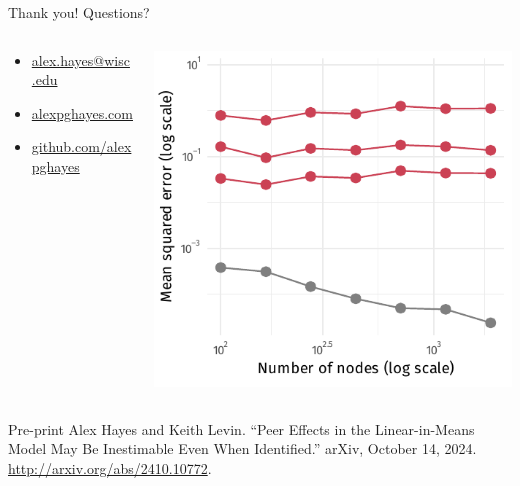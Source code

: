 \documentclass[aspectratio=169]{beamer}
\theoremstyle{remark}
\begin{document}
\begin{frame}{Thank you! Questions?}
    \footnotesize \phantom{test} \normalsize
    \begin{columns}
        \begin{column}{0.4\textwidth}
            \begin{itemize}
                \item[]  \href{mailto:alex.hayes@wisc.edu}{alex.hayes@wisc.edu}
                \item[]  \href{https://www.alexpghayes.com}{alexpghayes.com}
                \item[]  \href{https://github.com/alexpghayes}{github.com/alexpghayes}
            \end{itemize}
        \end{column}
        \begin{column}{0.6\textwidth}
            \centering
            \includegraphics[scale=0.65]{./figures/simulations/jobtalk-last-slide.pdf}
        \end{column}
    \end{columns}
    \footnotesize
    \begin{block}{Pre-print}
        Alex Hayes and Keith Levin. ``Peer Effects in the Linear-in-Means Model May Be Inestimable Even When Identified.'' arXiv, October 14, 2024. \url{http://arxiv.org/abs/2410.10772}.
    \end{block}
\end{frame}
\end{document}
